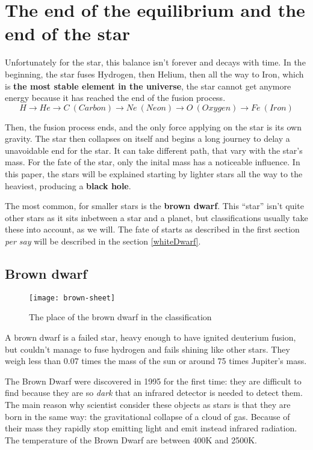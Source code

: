 \documentclass[a4paper, 11pt]{article} %
\begin{document}
\section{The end of the equilibrium and the end of the star}

Unfortunately for the star, this balance isn't forever and decays with time. In the beginning, the star fuses Hydrogen, then Helium, then all the way to Iron, which is \textbf{the most stable element in the universe}, the star cannot get anymore energy because it has reached the end of the fusion process.
\begin{equation}
H \rightarrow He \rightarrow C\ (Carbon) \rightarrow Ne\ (Neon)\rightarrow O\ (Oxygen)\rightarrow Fe\ (Iron)
\end{equation}

Then, the fusion process ends, and the only force applying on the star is its own gravity. The star then collapses on itself and begins a long journey to delay a unavoidable end for the star. It can take different path, that vary with the star's mass. For the fate of the star, only the inital mass has a noticeable influence. In this paper, the stars will be explained starting by lighter stars all the way to the heaviest, producing a \textbf{black hole}.

The most common, for smaller stars is the \textbf{brown dwarf}. This ``star'' isn't quite other stars as it sits inbetween a star and a planet, but classifications usually take these into account, as we will. The fate of starts as described in the first section \textit{per say} will be described in the section \ref{whiteDwarf}.

\newpage

\subsection{Brown dwarf}

\begin{figure}[h]
\centering
\texttt{[image: brown-sheet]}
\caption{The place of the brown dwarf in the classification }
\end{figure}

A brown dwarf is a failed star, heavy enough to have ignited deuterium fusion, but couldn't manage to fuse hydrogen and fails shining like other stars. They weigh less than 0.07 times the mass of the sun or around 75 times Jupiter's mass.


The Brown Dwarf were discovered in 1995 for the first time: they are difficult to find because they are so \textit{dark} that an infrared detector is needed to detect them. 
The main reason why scientist consider these objects as stars is that they are born in the same way: the gravitational collapse of a cloud of gas. Because of their mass they rapidly stop emitting light and emit instead infrared radiation. The temperature of the Brown Dwarf are between 400K and 2500K. 
\end{document}
